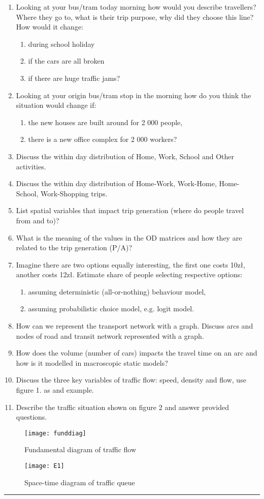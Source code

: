 \documentclass[11pt,a4paper]{article}
\begin{document}
\begin{enumerate}
\item Looking at your bus/tram today morning how would you describe travellers? Where they go to, what is their trip purpose, why did they choose this line? How would it change: 
\begin{enumerate}
\item during school holiday 
\item if the cars are all broken 
\item if there are huge traffic jams?
\end{enumerate}
\item Looking at your origin bus/tram stop in the morning how do you think the situation would change if: 
\begin{enumerate}
\item the new houses are built around for 2 000 people, 
\item there is a new office complex for 2 000 workers?
\end{enumerate}
\item Discuss the within day distribution of Home, Work, School and Other activities.
\item Discuss the within day distribution of Home-Work, Work-Home, Home-School, Work-Shopping trips.
\item List spatial variables that impact trip generation (where do people travel from and to)?
\item What is the meaning of the values in the OD matrices and how they are related to the trip generation (P/A)?
\item Imagine there are two options equally interesting, the first one costs 10zł, another costs 12zł. Estimate share of people selecting respective options: 
 \begin{enumerate} \item assuming deterministic (all-or-nothing) behaviour model, \item assuming probabilistic choice model, e.g. logit model. \end{enumerate}
\item How can we represent the transport network with a graph. Discuss arcs and nodes of road and transit network represented with a graph.
\item How does the volume (number of cars) impacts the travel time on an arc and how is it modelled in macroscopic static models?
\item Discuss the three key variables of traffic flow: speed, density and flow, use figure 1. as and example.
\item Describe the traffic situation shown on figure 2 and answer provided questions.
\end{enumerate}
\begin{figure}
\centering
\texttt{[image: funddiag]}
\caption{Fundamental diagram of traffic flow}
\end{figure}
\begin{figure}
\centering
\texttt{[image: E1]}
\caption{Space-time diagram of traffic queue}
\end{figure}
\noindent\rule{16.9cm}{1pt}
\end{document}
